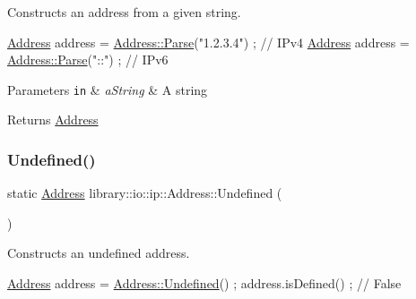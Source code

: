 Constructs an address from a given string. 


\begin{DoxyCode}
\hyperlink{classlibrary_1_1io_1_1ip_1_1_address_ab968d468b8bc2ba8f48fd2b6784832fe}{Address} address = \hyperlink{classlibrary_1_1io_1_1ip_1_1_address_af8ab0e365de3c00109b456ee94e2590b}{Address::Parse}(\textcolor{stringliteral}{"1.2.3.4"}) ; \textcolor{comment}{// IPv4}
\hyperlink{classlibrary_1_1io_1_1ip_1_1_address_ab968d468b8bc2ba8f48fd2b6784832fe}{Address} address = \hyperlink{classlibrary_1_1io_1_1ip_1_1_address_af8ab0e365de3c00109b456ee94e2590b}{Address::Parse}(\textcolor{stringliteral}{"::"}) ; \textcolor{comment}{// IPv6}
\end{DoxyCode}



\begin{DoxyParams}[1]{Parameters}
\mbox{\tt in}  & {\em a\+String} & A string \\
\hline
\end{DoxyParams}
\begin{DoxyReturn}{Returns}
\hyperlink{classlibrary_1_1io_1_1ip_1_1_address}{Address} 
\end{DoxyReturn}
\mbox{\label{classlibrary_1_1io_1_1ip_1_1_address_a6f567a698faa544fb27b52f02b3c52b6}} 
\subsubsection{\texorpdfstring{Undefined()}{Undefined()}}
{\footnotesize\ttfamily static \hyperlink{classlibrary_1_1io_1_1ip_1_1_address}{Address} library\+::io\+::ip\+::\+Address\+::\+Undefined (\begin{DoxyParamCaption}{ }\end{DoxyParamCaption})\hspace{0.3cm}{\ttfamily [static]}}



Constructs an undefined address. 


\begin{DoxyCode}
\hyperlink{classlibrary_1_1io_1_1ip_1_1_address_ab968d468b8bc2ba8f48fd2b6784832fe}{Address} address = \hyperlink{classlibrary_1_1io_1_1ip_1_1_address_a6f567a698faa544fb27b52f02b3c52b6}{Address::Undefined}() ;
address.isDefined() ; \textcolor{comment}{// False}
\end{DoxyCode}


